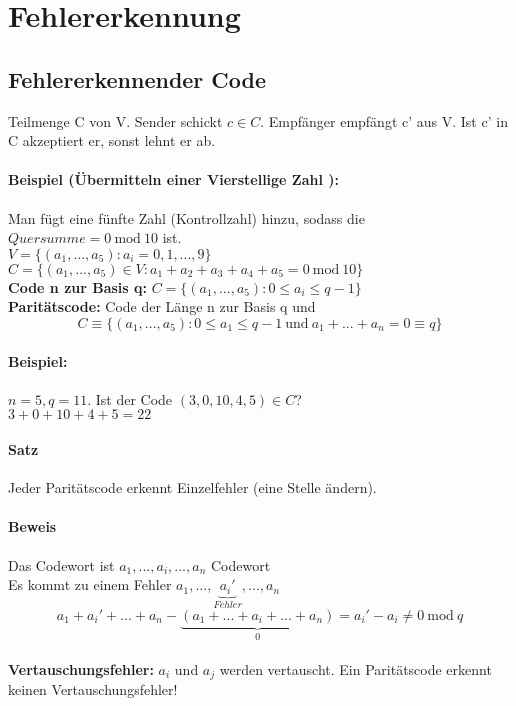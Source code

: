 \renewcommand{\ldate}{2015-05-11}	%

\section{Fehlererkennung}

\subsection{Fehlererkennender Code}
Teilmenge C von V. Sender schickt $ c \in C$. Empfänger empfängt c' aus V. Ist c' in C akzeptiert er, sonst lehnt er ab.
\paragraph{Beispiel (Übermitteln einer Vierstellige Zahl ):} Man fügt eine fünfte Zahl (Kontrollzahl) hinzu, sodass die $ Quersumme = 0 \ \mbox{mod} \ 10 $ ist. \\
$ V=\{(a_1,...,a_5) : a_i = 0,1,...,9\} $\\
$ C=\{(a_1,...,a_5) \in V: a_1 + a_2 + a_3 + a_4 + a_5 = 0 \ \mbox{mod} \ 10\} $\\
\textbf{Code n zur Basis q:} $ C=\{(a_1,...,a_5) : 0 \leq a_i \leq q-1\} $\\
\textbf{Paritätscode:} Code der Länge n zur Basis q und 
\[ C \equiv \{(a_1,...,a_5) : 0 \le a_1 \le q-1 \ \mbox{und} \ a_1 + ... + a_n = 0 \equiv q \}\]

\paragraph{Beispiel:} $n=5, q=11$. Ist der Code $ (3,0,10,4,5) \in C$?\\
$ 3+0+10+4+5=22 $

\paragraph{Satz} 
Jeder Paritätscode erkennt Einzelfehler (eine Stelle ändern). 

\paragraph{Beweis}
Das Codewort ist $a_1,...,a_i,...,a_n $ Codewort\\
Es kommt zu einem Fehler $a_1,...,\underbrace{a_i'}_{Fehler},...,a_n \ $\\
\[a_1 + a_i' + ... + a_n - \underbrace{(a_1 + ... + a_i + ... + a_n)}_{0} = 
a_i' - a_i \neq 0 \ \mbox{mod} \ q\]\\
\textbf{Vertauschungsfehler:} $a_i$ und $a_j$ werden vertauscht. Ein Paritätscode erkennt keinen Vertauschungsfehler!

